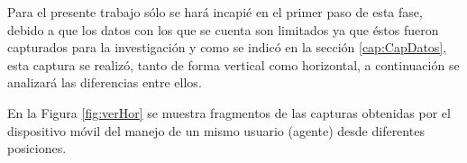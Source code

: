 Para el presente trabajo s\'{o}lo se har\'{a} incapi\'{e} en el primer paso de esta fase, debido a que los datos con los que se cuenta son limitados ya que \'{e}stos fueron capturados para la investigaci\'{o}n y como se indic\'{o} en la secci\'{o}n \ref{cap:CapDatos}, esta captura se realiz\'{o}, tanto de forma vertical como horizontal, a continuaci\'{o}n se analizar\'{a} las diferencias entre ellos.

\vspace{5mm} %

En la Figura \ref{fig:verHor} se muestra fragmentos de las capturas obtenidas por el dispositivo m\'{o}vil del manejo de un mismo usuario (agente) desde diferentes posiciones.

\begin{figure}
\end{figure}
